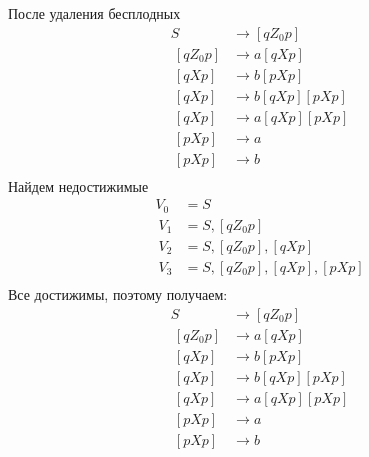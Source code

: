 \documentclass[a4paper,12pt]{article}
\begin{document}
После удаления бесплодных
\begin{align*}
	S&\to [qZ_0p]\\\		
	[qZ_0p]&\to a[qXp]\\\		
	[qXp]&\to b[pXp]\\\
	[qXp]&\to b[qXp][pXp]\\\
	[qXp]&\to a[qXp][pXp]\\\
	[pXp]&\to a\\\
	[pXp]&\to b\\\
\end{align*}
Найдем недостижимые
\begin{align*}
	V_0&=S\\\
	V_1&=S,[qZ_0p]\\\
	V_2&=S,[qZ_0p],[qXp]\\\
	V_3&=S,[qZ_0p],[qXp],[pXp]\\\
\end{align*}
Все достижимы, поэтому получаем:
\begin{align*}
	S&\to [qZ_0p]\\\		
	[qZ_0p]&\to a[qXp]\\\		
	[qXp]&\to b[pXp]\\\
	[qXp]&\to b[qXp][pXp]\\\
	[qXp]&\to a[qXp][pXp]\\\
	[pXp]&\to a\\\
	[pXp]&\to b\\\
\end{align*}
\end{document}
